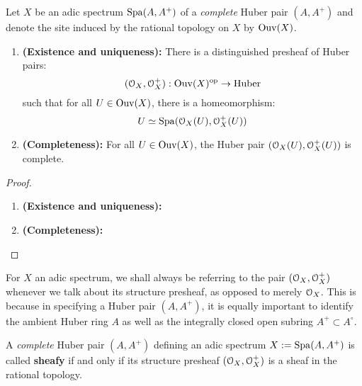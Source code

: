            \begin{proposition} \label{prop: structure_presheaves_of_adic_spectra}
                Let $X$ be an adic spectrum $\mathrm{Spa}(A, A^+)$ of a \textit{complete} Huber pair $(A, A^+)$ and denote the site induced by the rational topology on $X$ by $\mathrm{Ouv}(X)$. 
                    \begin{enumerate}
                        \item \textbf{(Existence and uniqueness):} There is a distinguished presheaf of Huber pairs:
                            $$(\mathcal{O}_X, \mathcal{O}_X^+): \mathrm{Ouv}(X)^{\mathrm{op}} \to \mathrm{Huber}$$
                        such that for all $U \in \mathrm{Ouv}(X)$, there is a homeomorphism:
                            $$U \simeq \mathrm{Spa}(\mathcal{O}_X(U), \mathcal{O}_X^+(U))$$
                        \item \textbf{(Completeness):} For all $U \in \mathrm{Ouv}(X)$, the Huber pair $(\mathcal{O}_X(U), \mathcal{O}_X^+(U))$ is complete.
                    \end{enumerate}
            \end{proposition} 
                \begin{proof}
                    \noindent
                    \begin{enumerate}
                        \item \textbf{(Existence and uniqueness):}
                        \item \textbf{(Completeness):}
                    \end{enumerate}
                \end{proof}
            \begin{convention}
                For $X$ an adic spectrum, we shall always be referring to the pair $(\mathcal{O}_X, \mathcal{O}_X^+)$ whenever we talk about its structure presheaf, as opposed to merely $\mathcal{O}_X$. This is because in specifying a Huber pair $(A, A^+)$, it is equally important to identify the ambient Huber ring $A$ as well as the integrally closed open subring $A^+ \subset A^{\circ}$.
            \end{convention}
            \begin{definition}[Sheafiness] \label{def: sheafiness}
                A \textit{complete} Huber pair $(A, A^+)$ defining an adic spectrum $X := \mathrm{Spa}(A, A^+)$ is called \textbf{sheafy} if and only if its structure presheaf $(\mathcal{O}_X, \mathcal{O}_X^+)$ is a sheaf in the rational topology.
            \end{definition}
            
